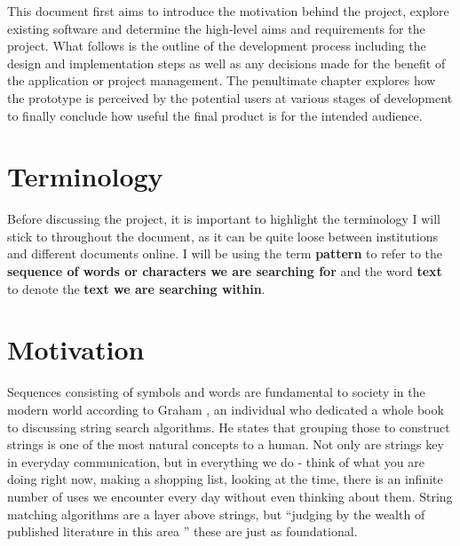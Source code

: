 \documentclass{l4proj}
\begin{document}
This document first aims to introduce the motivation behind the project,  explore existing software and determine the high-level aims and requirements for the project. What follows is the outline of the development process including the design and implementation steps as well as any decisions made for the benefit of the application or project management. The penultimate chapter explores how the prototype is perceived by the potential users at various stages of development to finally conclude how useful the final product is for the intended audience.


\section{Terminology}

Before discussing the project, it is important to highlight the terminology I will stick to throughout the document, as it can be quite loose between institutions and different documents online.  I will be using the term \textbf{pattern} to refer to the \textbf{sequence of words or characters we are searching for} and the word \textbf{text} to denote the \textbf{text we are searching within}.

\section{Motivation}

Sequences consisting of symbols and words are fundamental to society in the modern world according to Graham \citet{Stephen_1994}, an individual who dedicated a whole book to discussing string search algorithms. He states that grouping those to construct strings is one of the most natural concepts to a human. Not only are strings key in everyday communication, but in everything we do - think of what you are doing right now, making a shopping list, looking at the time, there is an infinite number of uses we encounter every day without even thinking about them.  String matching algorithms are a layer above strings, but ``judging by the wealth of published literature in this area \citep{Stephen_1994}'' these are just as foundational.
\end{document}
